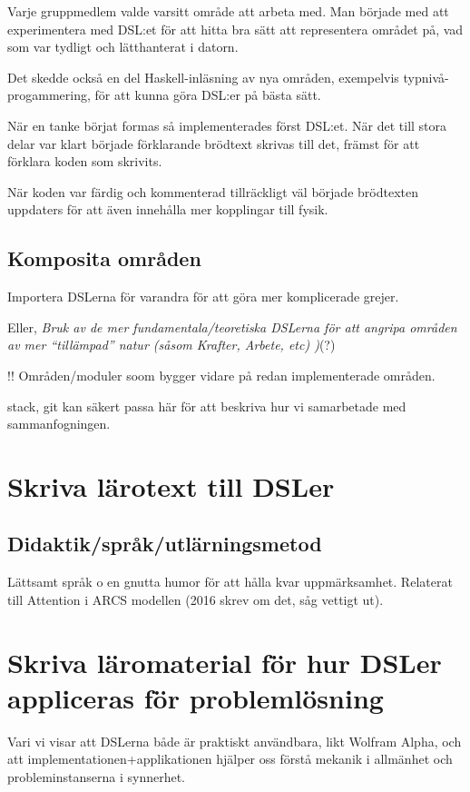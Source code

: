 \begin{binge}
Varje gruppmedlem valde varsitt område att arbeta med. Man började med att
experimentera med DSL:et för att hitta bra sätt att representera området på,
vad som var tydligt och lätthanterat i datorn.

Det skedde också en del Haskell-inläsning av nya områden, exempelvis
typnivå-progammering, för att kunna göra DSL:er på bästa sätt.

När en tanke börjat formas så implementerades först DSL:et. När det till stora
delar var klart började förklarande brödtext skrivas till det, främst för att
förklara koden som skrivits.

När koden var färdig och kommenterad tillräckligt väl började brödtexten
uppdaters för att även innehålla mer kopplingar till fysik.

\subsection{Komposita områden}

Importera DSLerna för varandra för att göra mer komplicerade grejer.

Eller, \emph{Bruk av de mer fundamentala/teoretiska DSLerna för att
  angripa områden av mer ``tillämpad'' natur (såsom Krafter, Arbete,
  etc) )}(?)

!! Områden/moduler soom bygger vidare på redan implementerade områden.

stack, git kan säkert passa här för att beskriva hur vi samarbetade med sammanfogningen.

\section{Skriva lärotext till DSLer}

\subsection{Didaktik/språk/utlärningsmetod}

Lättsamt språk o en gnutta humor för att hålla kvar
uppmärksamhet. Relaterat till Attention i ARCS modellen (2016 skrev om
det, såg vettigt ut).

\section{Skriva läromaterial för hur DSLer appliceras för problemlösning}

Vari vi visar att DSLerna både är praktiskt användbara, likt Wolfram
Alpha, och att implementationen+applikationen hjälper oss förstå
mekanik i allmänhet och probleminstanserna i synnerhet.


\end{binge}
